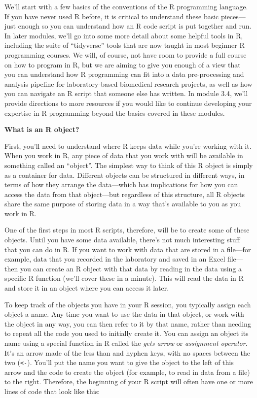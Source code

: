 \documentclass[]{tufte-book}
\begin{document}
We'll start with a few basics of the conventions of the R programming language.
If you have never used R before, it is critical to understand these basic
pieces---just enough so you can understand how an R code script is put together
and run. In later modules, we'll go into some more detail about some helpful
tools in R, including the suite of ``tidyverse''
tools that are now taught in most beginner R programming courses. We will, of
course, not have room to provide a full course on how to program in R, but we
are aiming to give you enough of a view that you can understand how R
programming can fit into a data pre-processing and analysis pipeline for
laboratory-based biomedical research projects, as well as how you can navigate
an R script that someone else has written. In module 3.4, we'll provide
directions to more resources if you would like to continue developing your
expertise in R programming beyond the basics covered in these modules.

\textbf{What is an R object?}

First, you'll need to understand where R keeps data while you're working with
it. When you work in R, any piece of data that you work with will be available
in something called an ``object''. The simplest way to think of this R object is
simply as a container for data. Different objects can be structured in different
ways, in terms of how they arrange the data---which has implications for how
you can access the data from that object---but regardless of this structure, all
R objects share the same purpose of storing data in a way that's available to
you as you work in R.

One of the first steps in most R scripts, therefore, will be to create some of
these objects. Until you have some data available, there's not much interesting
stuff that you can do in R. If you want to work with data that are stored in a
file---for example, data that you recorded in the laboratory and saved in an
Excel file---then you can create an R object with that data by reading in the
data using a specific R function (we'll cover these in a minute). This will read
the data in R and store it in an object where you can access it later.

To keep track of the objects you have in your R session, you typically assign
each object a name. Any time you want to use the data in that object, or work
with the object in any way, you can then refer to it by that name, rather than
needing to repeat all the code you used to initially create it. You can assign
an object its name using a special function in R called the \emph{gets arrow} or
\emph{assignment operator}. It's an arrow made of the less than and hyphen keys, with
no spaces between the two (\texttt{\textless{}-}). You'll put the name you want to give the object
to the left of this arrow and the code to create the object (for example, to read
in data from a file) to the right. Therefore, the beginning of your R script
will often have one or more lines of code that look like this:
\end{document}
